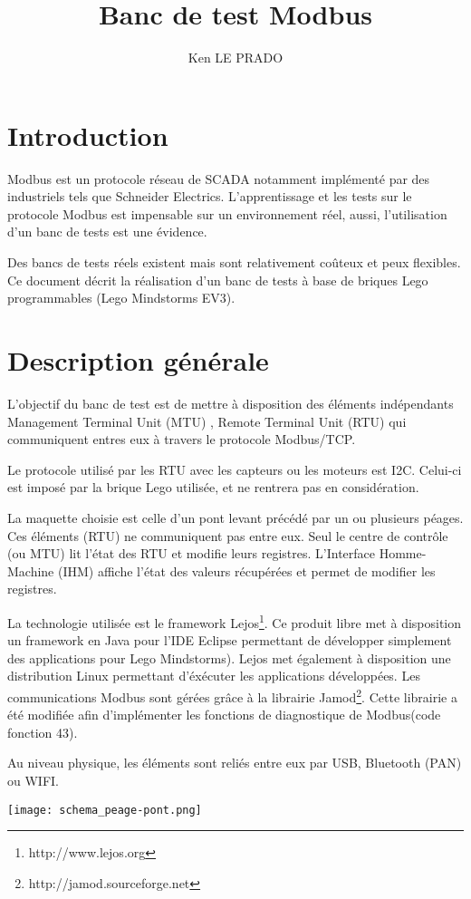 \documentclass[10pt,a4paper]{article}
\author{Ken LE PRADO}
\title{Banc de test Modbus}
\begin{document}
\section{Introduction}

Modbus est un protocole réseau de SCADA notamment implémenté par des industriels tels que Schneider Electrics.
L'apprentissage et les tests sur le protocole Modbus est impensable sur un environnement réel, aussi, l'utilisation d'un banc de tests est une évidence.

Des bancs de tests réels existent mais sont relativement co\^uteux et peux flexibles. Ce document décrit la réalisation d'un banc de tests à base de briques Lego programmables (Lego Mindstorms EV3).

\section{Description générale}
L'objectif du banc de test est de mettre à disposition des éléments indépendants Management Terminal Unit (MTU) , Remote Terminal Unit (RTU)  qui communiquent entres eux à travers le protocole Modbus/TCP.

Le protocole utilisé par les RTU avec les capteurs ou les moteurs est I2C. Celui-ci est imposé par la brique Lego utilisée, et ne rentrera pas en considération.

La maquette choisie est celle d'un pont levant précédé par un ou plusieurs péages. Ces éléments (RTU) ne communiquent pas entre eux. Seul le centre de contr\^ole (ou MTU) lit l'état des RTU et modifie leurs registres.
L'Interface Homme-Machine (IHM) affiche l'état des valeurs récupérées et permet de modifier les registres.

La technologie utilisée est le framework Lejos\footnote{http://www.lejos.org}. Ce produit libre met à disposition un framework en Java pour l'IDE Eclipse permettant de développer simplement des applications pour Lego Mindstorms). Lejos met également à disposition une distribution Linux permettant d'éxécuter les applications développées.
Les communications Modbus sont gérées grâce à la librairie Jamod\footnote{http://jamod.sourceforge.net}. Cette librairie a été modifiée afin d'implémenter les fonctions de diagnostique de Modbus(code fonction 43).

Au niveau physique, les éléments sont reliés entre eux par USB, Bluetooth (PAN) ou WIFI.

\begin{center}
\texttt{[image: schema\_peage-pont.png]}
\end{center}
\end{document}
